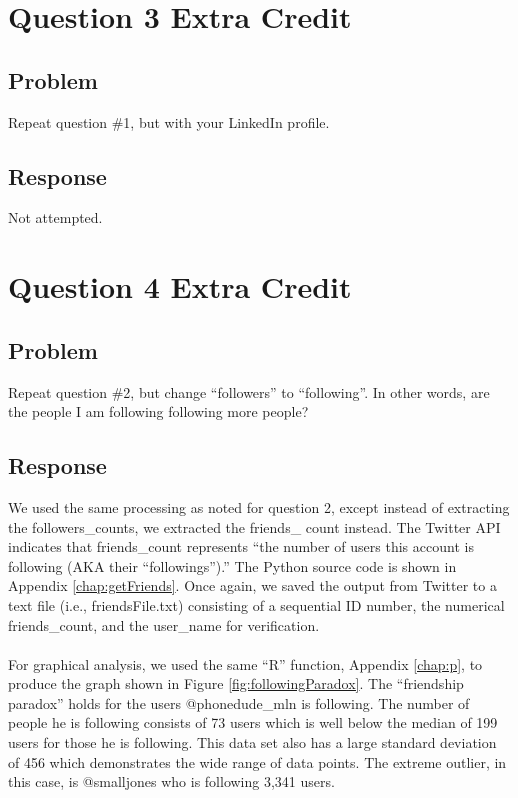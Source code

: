 \documentclass[letterpaper,11pt]{report}
\begin{document}
\begin{savenotes}
\section{Question 3 Extra Credit}
\subsection{Problem}Repeat question \#1, but with your LinkedIn profile.
\subsection{Response}Not attempted.

\section{Question 4 Extra Credit}
\subsection{Problem}Repeat question \#2, but change ``followers'' to ``following''. In other words, are the people I am following following more people?
\subsection{Response}We used the same processing as noted for question 2, except instead of extracting the followers\_counts, we extracted the friends\_ count instead. The Twitter API indicates that friends\_count represents ``the number of users this account is following (AKA their ``followings'').''  The Python source code is shown in Appendix \ref{chap:getFriends}. Once again, we saved the output from Twitter to a text file (i.e., friendsFile.txt) consisting of a sequential ID number, the numerical friends\_count, and the user\_name for verification.

\paragraph{} For graphical analysis, we used the same ``R'' function, Appendix \ref{chap:p}, to produce the graph shown in Figure \ref{fig:followingParadox}. The ``friendship paradox'' holds for the users @phonedude\_mln is following. The number of people he is following consists of 73 users which is well below the median of 199 users for those he is following. This data set also has a large standard deviation of 456 which demonstrates the wide range of data points. The extreme outlier, in this case, is @smalljones who is following 3,341 users.


\end{savenotes}
\end{document}
